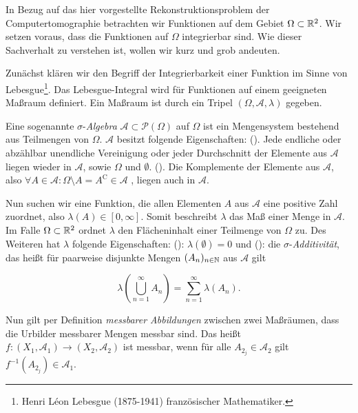 In Bezug auf das hier vorgestellte Rekonstruktionsproblem der Computertomographie betrachten wir Funktionen auf dem Gebiet $\Omega \subset \mathbb{R}^2$. Wir setzen voraus, dass die Funktionen auf $\Omega$ integrierbar sind. Wie dieser Sachverhalt zu verstehen ist, wollen wir kurz und grob andeuten.

Zunächst klären wir den Begriff der Integrierbarkeit einer Funktion im Sinne von Lebesgue\footnote{Henri Léon Lebesgue (1875-1941) französischer Mathematiker.}. Das Lebesgue-Integral wird für Funktionen auf einem geeigneten Maßraum definiert. Ein Maßraum ist durch ein Tripel $( \Omega, \mathcal{A}, \lambda)$ gegeben.

Eine sogenannte $\sigma$-\textit{Algebra} $\mathcal{A} \subset \mathcal{P}(\Omega)$ auf $\Omega$ ist ein Mengensystem bestehend aus Teilmengen von $\Omega$. $\mathcal{A}$ besitzt folgende Eigenschaften: (). Jede endliche oder abzählbar unendliche Vereinigung oder jeder Durchschnitt der Elemente aus $\mathcal{A}$ liegen wieder in $\mathcal{A}$, sowie $\Omega$ und $\emptyset$. (). Die Komplemente der Elemente aus $\mathcal{A}$, also $\forall A \in \mathcal{A} : \Omega \setminus A = A^\mathrm{C} \in \mathcal{A}$ , liegen auch in $\mathcal{A}$.

Nun suchen wir eine Funktion, die allen Elementen $A$ aus $\mathcal{A}$ eine positive Zahl zuordnet, also $\lambda(A) \in [0, \infty]$. Somit beschreibt $\lambda$ das Maß einer Menge in $\mathcal{A}$. Im Falle $\Omega \subset \mathbb{R}^2$ ordnet $\lambda$ den Flächeninhalt einer Teilmenge von $\Omega$ zu. Des Weiteren hat $\lambda$ folgende Eigenschaften: (): $\lambda(\emptyset) = 0$ und (): die $\sigma$-\textit{Additivität}, das heißt für paarweise disjunkte Mengen $(A_n)_{n \in \mathbb{N}}$ aus $\mathcal{A}$ gilt
 
\[ \lambda \left(  \bigcup\limits_{n=1}^{\infty} A_n \right) = \sum\limits_{n = 1}^{\infty} \lambda(A_n).\]  

Nun gilt per Definition \textit{messbarer Abbildungen} zwischen zwei Maßräumen, dass die Urbilder messbarer Mengen messbar sind. Das heißt $f:(X_1, \mathcal{A}_1) \rightarrow (X_2, \mathcal{A}_2)$ ist messbar, wenn für alle $A_{2_j} \in \mathcal{A}_2$ gilt $f^{-1}(A_{2_j}) \in \mathcal{A}_1$. 


